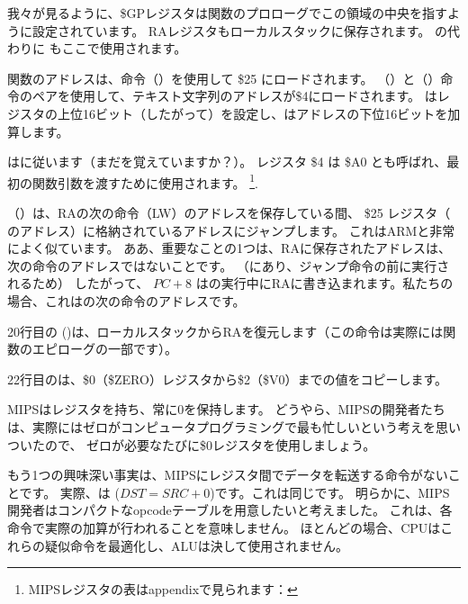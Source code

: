 我々が見るように、\$GPレジスタは関数のプロローグでこの領域の中央を指すように設定されています。 
\ac{RA}レジスタもローカルスタックに保存されます。 
\printf の代わりに \puts もここで使用されます。 

\puts 関数のアドレスは、命令（）を使用して \$25 にロードされます。 
（）と（）命令のペアを使用して、テキスト文字列のアドレスが\$4にロードされます。 
はレジスタの上位16ビット（したがって）を設定し、はアドレスの下位16ビットを加算します。

はに従います（まだを覚えていますか？）。
レジスタ \$4 は \$A0 とも呼ばれ、最初の関数引数を渡すために使用されます。
\footnote{MIPSレジスタの表はappendixで見られます：}.


（）は、\ac{RA}の次の命令（LW）のアドレスを保存している間、
\$25 レジスタ（ \puts のアドレス）に格納されているアドレスにジャンプします。
これはARMと非常によく似ています。
ああ、重要なことの1つは、RAに保存されたアドレスは、次の命令のアドレスではないことです。
（にあり、ジャンプ命令の前に実行されるため）
したがって、 $PC + 8$ はの実行中に\ac{RA}に書き込まれます。私たちの場合、これはの次の命令のアドレスです。

20行目の ()は、ローカルスタックから\ac{RA}を復元します（この命令は実際には関数のエピローグの一部です）。

22行目のは、\$0（\$ZERO）レジスタから\$2（\$V0）までの値をコピーします。
\label{MIPS_zero_register}

MIPSはレジスタを持ち、常に0を保持します。
どうやら、MIPSの開発者たちは、実際にはゼロがコンピュータプログラミングで最も忙しいという考えを思いついたので、
ゼロが必要なたびに\$0レジスタを使用しましょう。

もう1つの興味深い事実は、MIPSにレジスタ間でデータを転送する命令がないことです。 
実際、は ($DST=SRC+0$)です。これは同じです。 
明らかに、MIPS開発者はコンパクトなopcodeテーブルを用意したいと考えました。 
これは、各命令で実際の加算が行われることを意味しません。 
ほとんどの場合、\ac{CPU}はこれらの疑似命令を最適化し、\ac{ALU}は決して使用されません。

